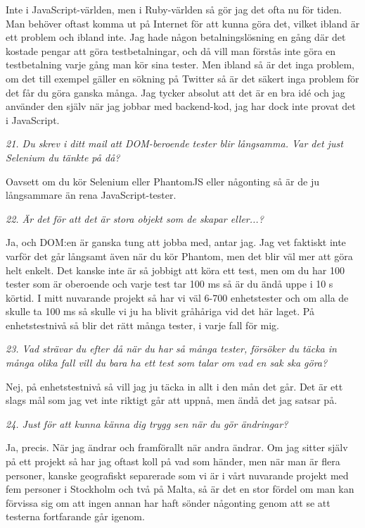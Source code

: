 \documentclass[11pt]{article}
\begin{document}
Inte i JavaScript-världen, men i Ruby-världen så gör jag det ofta nu för tiden. Man behöver oftast komma ut på Internet för att kunna göra det, vilket ibland är ett problem och ibland inte. Jag hade någon betalningslösning en gång där det kostade pengar att göra testbetalningar, och då vill man förstås inte göra en testbetalning varje gång man kör sina tester. Men ibland så är det inga problem, om det till exempel gäller en sökning på Twitter så är det säkert inga problem för det får du göra ganska många. Jag tycker absolut att det är en bra idé och jag använder den själv när jag jobbar med backend-kod, jag har dock inte provat det i JavaScript.

\emph{21. Du skrev i ditt mail att DOM-beroende tester blir långsamma. Var det just Selenium du tänkte på då?}

Oavsett om du kör Selenium eller PhantomJS eller någonting så är de ju långsammare än rena JavaScript-tester.

\emph{22. Är det för att det är stora objekt som de skapar eller...?}

Ja, och DOM:en är ganska tung att jobba med, antar jag. Jag vet faktiskt inte varför det går långsamt även när du kör Phantom, men det blir väl mer att göra helt enkelt. Det kanske inte är så jobbigt att köra ett test, men om du har 100 tester som är oberoende och varje test tar 100 ms så är du ändå uppe i 10 s körtid. I mitt nuvarande projekt så har vi väl 6-700 enhetstester och om alla de skulle ta 100 ms så skulle vi ju ha blivit gråhåriga vid det här laget. På enhetstestnivå så blir det rätt många tester, i varje fall för mig.

\emph{23. Vad strävar du efter då när du har så många tester, försöker du täcka in många olika fall vill du bara ha ett test som talar om vad en sak ska göra?}

Nej, på enhetstestnivå så vill jag ju täcka in allt i den mån det går. Det är ett slags mål som jag vet inte riktigt går att uppnå, men ändå det jag satsar på.

\emph{24. Just för att kunna känna dig trygg sen när du gör ändringar?}

Ja, precis. När jag ändrar och framförallt när andra ändrar. Om jag sitter själv på ett projekt så har jag oftast koll på vad som händer, men när man är flera personer, kanske geografiskt separerade som vi är i vårt nuvarande projekt med fem personer i Stockholm och två på Malta, så är det en stor fördel om man kan förvissa sig om att ingen annan har haft sönder någonting genom att se att testerna fortfarande går igenom.
\end{document}
